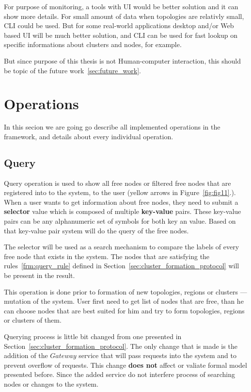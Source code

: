 For purpose of monitoring, a tools with UI would be better solution and it can show more details. For small amount of data when topologies are relativly small, CLI could be used. But for some real-world applications desktop and/or Web based UI will be much better solution, and CLI can be used for fast lookup on specific informations about clusters and nodes, for example.

But since purpose of this thesis is not Human-computer interaction, this should be topic of the future work~\ref{sec:future_work}.
%
%
\section{Operations}\label{sec:framework_operations}
%
In this secion we are going go describe all implemented operations in the framework, and details about every individual operation.
%
%
\subsection{Query}\label{sec:query} 
% 
Query operation is used to show all free nodes or filtered free nodes that are registered into to the system, to the user (yellow arrows in Figure~\ref{fig:fig11}.). When a user wants to get information about free nodes, they need to submit a \textbf{selector} value which is composed of multiple \textbf{key-value} pairs.  These key-value pairs can be any alphanumeric set of symbols for both key an value. Based on that key-value pair system will do the query of the free nodes.

The selector will be used as a search mechanism to compare the labels of every free node that exists in the system. The nodes that are satisfying the rules~\ref{frm:query_rule} defined in Section~\ref{sec:cluster_formation_protocol} will be present in the result.

This operation is done prior to formation of new topologies, regions or clusters --- mutation of the system. User first need to get list of nodes that are free, than he can choose nodes that are best suited for him and try to form topologies, regions or clusters of them.

Querying process is little bit changed from one presented in Section~\ref{sec:cluster_formation_protocol}. The only change that is made is the addition of the $Gateway$ service that will pass requests into the system and to prevent overflow of requests. This change \textbf{does not} affect or valiate formal model presented before. Since the added service do not interfere process of searching nodes or changes to the system.

